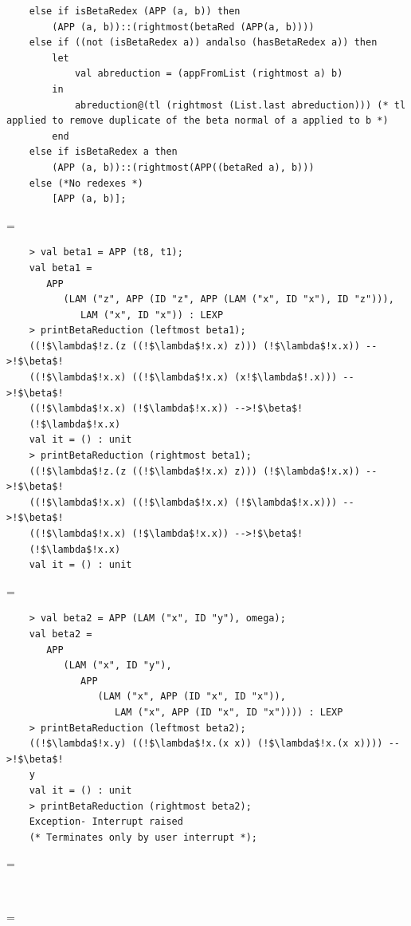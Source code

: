 \documentclass[11pt]{article}
\newenvironment{neverbreak} %
{\par\nobreak\vfil\penalty0\vfilneg
	\vtop\bgroup}
{\par\xdef\tpd{\the\prevdepth}\egroup
	\prevdepth=\tpd}
\begin{document}
\begin{enumerate}
\begin{neverbreak}
\begin{verbatim}
	else if isBetaRedex (APP (a, b)) then
		(APP (a, b))::(rightmost(betaRed (APP(a, b))))
	else if ((not (isBetaRedex a)) andalso (hasBetaRedex a)) then
		let
			val abreduction = (appFromList (rightmost a) b)
		in
			abreduction@(tl (rightmost (List.last abreduction))) (* tl applied to remove duplicate of the beta normal of a applied to b *)
		end
	else if isBetaRedex a then
		(APP (a, b))::(rightmost(APP((betaRed a), b)))
	else (*No redexes *)
		[APP (a, b)];
\end{verbatim}
\end{neverbreak}
\vspace{1cm}
\begin{neverbreak}
\begin{verbatim}
	> val beta1 = APP (t8, t1);
	val beta1 =
	   APP
	      (LAM ("z", APP (ID "z", APP (LAM ("x", ID "x"), ID "z"))),
	         LAM ("x", ID "x")) : LEXP 
	> printBetaReduction (leftmost beta1);
	((!$\lambda$!z.(z ((!$\lambda$!x.x) z))) (!$\lambda$!x.x)) -->!$\beta$!
	((!$\lambda$!x.x) ((!$\lambda$!x.x) (x!$\lambda$!.x))) -->!$\beta$!
	((!$\lambda$!x.x) (!$\lambda$!x.x)) -->!$\beta$!
	(!$\lambda$!x.x)
	val it = () : unit
	> printBetaReduction (rightmost beta1);
	((!$\lambda$!z.(z ((!$\lambda$!x.x) z))) (!$\lambda$!x.x)) -->!$\beta$!
	((!$\lambda$!x.x) ((!$\lambda$!x.x) (!$\lambda$!x.x))) -->!$\beta$!
	((!$\lambda$!x.x) (!$\lambda$!x.x)) -->!$\beta$!
	(!$\lambda$!x.x)
	val it = () : unit
\end{verbatim}
\end{neverbreak}
	
\begin{neverbreak}
\begin{verbatim}
	> val beta2 = APP (LAM ("x", ID "y"), omega);
	val beta2 =
	   APP
	      (LAM ("x", ID "y"),
	         APP
	            (LAM ("x", APP (ID "x", ID "x")),
	               LAM ("x", APP (ID "x", ID "x")))) : LEXP
	> printBetaReduction (leftmost beta2);
	((!$\lambda$!x.y) ((!$\lambda$!x.(x x)) (!$\lambda$!x.(x x)))) -->!$\beta$!
	y
	val it = () : unit
	> printBetaReduction (rightmost beta2);
	Exception- Interrupt raised 
	(* Terminates only by user interrupt *);
\end{verbatim}
\end{neverbreak}
	
\begin{neverbreak}
\begin{verbatim}	
	

\end{verbatim}
\end{neverbreak}
\end{enumerate}
\end{document}
